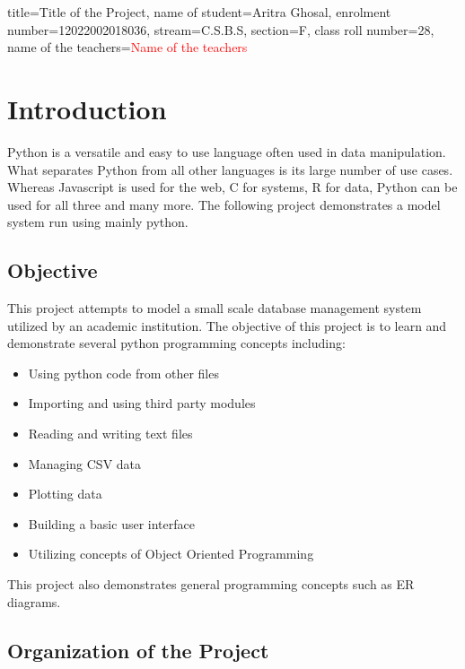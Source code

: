 \documentclass{article}
\begin{document}
\opening{
	title=Title of the Project,
	name of student=Aritra Ghosal,
	enrolment number=12022002018036,
	stream=C.S.B.S,
	section=F,
	class roll number=28,
	name of the teachers=\textcolor{red}{Name of the teachers}
}
\newpage
\section{Introduction}
	Python is a versatile and easy to use language often used in data manipulation. What separates Python from all other languages is its large number of use cases. Whereas Javascript is used for the web, C for systems, R for data, Python can be used for all three and many more. The following project demonstrates a model system run using mainly python.
	\subsection{Objective}
		This project attempts to model a small scale database management system utilized by an academic institution.
		The objective of this project is to learn and demonstrate several python programming concepts including:
			\begin{itemize}
				\item Using python code from other files
				\item Importing and using third party modules
				\item Reading and writing text files
				\item Managing CSV data
				\item Plotting data
				\item Building a basic user interface
				\item Utilizing concepts of Object Oriented Programming
			\end{itemize}
		This project also demonstrates general programming concepts such as ER diagrams.

	\begin{minipage}{\textwidth}
		\subsection{Organization of the Project}
			\\
	\end{minipage}
\end{document}
